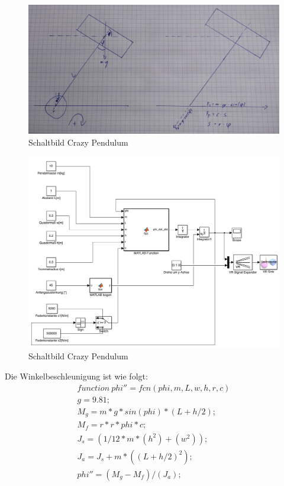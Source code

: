 \documentclass[10pt,a4paper]{article}
\begin{document}
	\begin{figure}[H]
 		\centering
 		\includegraphics[width=1\textwidth]{../aufgabe2/Freikoerper.jpg}
 		\caption{Schaltbild Crazy Pendulum}
 	\end{figure}

 	\begin{figure}[H]
 		\centering
 		\includegraphics[width=1\textwidth]{../aufgabe2/simulink.png}
 		\caption{Schaltbild Crazy Pendulum}
 	\end{figure}
 	Die Winkelbeschleunigung ist wie folgt:
 	\begin{align}
 	function \: phi'' = fcn(phi, m, L, w, h, r, c)
 	\\g = 9.81; \nonumber
 	\\M_g = m * g * sin(phi)*(L+h/2);\nonumber
 	\\M_f = r * r * phi * c;\nonumber
 	\\J_s = (1/12 * m * (h^2) + (w^2));\nonumber
 	\\J_a = J_s + m * ((L+h/2)^2);\nonumber
 	\\phi'' = ( M_g - M_f ) / ( J_a );\nonumber
 	\end{align}
 	
\end{document}
